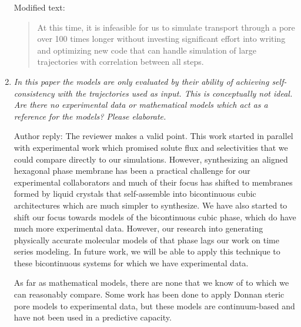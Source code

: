 \documentclass{article}
\begin{document}
\begin{enumerate}[label={Comment \theenumi :}, leftmargin=3.9\parindent]
	  	Modified text:
	  	\begin{quote}
	  	At this time, it is infeasible for us to simulate transport through a pore over 100 times
	  	longer without investing significant effort into writing and optimizing new code that can
	  	handle simulation of large trajectories with correlation between all steps.
	  	\end{quote}
  
  \item \textit{In this paper the models are only evaluated by their ability of achieving 
		  self-consistency with the trajectories used as input. This is conceptually not ideal. 
		  Are there no experimental data or mathematical models which act as a reference for 
		  the models? Please elaborate.}
		  
		  Author reply: The reviewer makes a valid point. This work started in parallel with experimental
		  work which promised solute flux and selectivities that we could compare directly to our
		  simulations. However, synthesizing an aligned hexagonal phase membrane has been a practical
		  challenge for our experimental collaborators and much of their focus has shifted to 
		  membranes formed by liquid crystals that self-assemble into bicontinuous cubic architectures
		  which are much simpler to synthesize. We have also started to shift our focus towards models 
		  of the bicontinuous cubic phase, which do have much more experimental data. However, our 
		  research into generating physically accurate molecular models of that phase lags our work on
		  time series modeling. In future work, we will be able to apply this technique to these 
		  bicontinuous systems for which we have experimental data.
		  

                  
		  As far as mathematical models, there are none that we know of to which we can reasonably
		  compare. Some work has been done to apply Donnan steric pore models to experimental data, 
		  but these models are continuum-based and have not been used in a predictive capacity.
		  

\end{enumerate}
\end{document}
